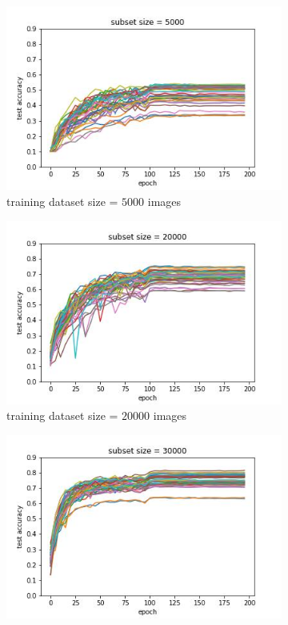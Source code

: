 \documentclass{article} %
\begin{document}
\begin{figure}
    \begin{subfigure}{.5\textwidth}
        \centering
        \includegraphics[width=.8\linewidth]{cifar10/test_acc_vs_epoch_subset_size_5000.jpg}
        \caption{training dataset size = $5000$ images}
        \label{fig:subsetsize5000}
    \end{subfigure}%
    \begin{subfigure}{.5\textwidth}
        \centering
        \includegraphics[width=.8\linewidth]{cifar10/test_acc_vs_epoch_subset_size_20000.jpg}
        \caption{training dataset size = $20000$ images}
        \label{fig:subsetsize20000}
    \end{subfigure}
    \begin{subfigure}{.5\textwidth}
        \centering
        \includegraphics[width=.8\linewidth]{cifar10/test_acc_vs_epoch_subset_size_30000.jpg}

\end{subfigure}
\end{figure}
\end{document}
